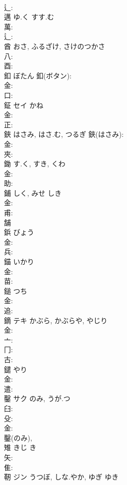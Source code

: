 \documentclass[8pt]{extreport}
\begin{document}
\begin{CJK}{UTF8}{min}
\\	辶: 
\\	邁		ゆ.く	すす.む			
\\	萬: 
\\	辶: 
\\	酋		おさ, ふるざけ, さけのつかさ				
\\	八: 
\\	酉: 
\\	釦		ぼたん			釦(ボタン): 
\\	金: 
\\	口: 
\\	鉦	セイ	かね		
\\	金: 
\\	正: 
\\	鋏		はさみ, はさ.む, つるぎ			鋏(はさみ): 
\\	金: 
\\	夾: 
\\	鋤		す.く, すき, くわ				
\\	金: 
\\	助: 
\\	鋪		しく, みせ	しき			
\\	金: 
\\	甫: 
\\	舗 
\\	鋲		びょう				
\\	金: 
\\	兵: 
\\	錨		いかり				
\\	金: 
\\	苗: 
\\	鎚		つち				
\\	金: 
\\	追: 
\\	鏑	テキ	かぶら, かぶらや, やじり		
\\	金: 
\\	亠: 
\\	冂: 
\\	古: 
\\	鑓		やり				
\\	金: 
\\	遣: 
\\	鑿	サク	のみ, うが.つ		
\\	臼: 
\\	殳: 
\\	金: 
\\	鑿(のみ), 
\\	雉		きじ	き			
\\	矢: 
\\	隹: 
\\	靭	ジン	うつぼ, しな.やか, ゆぎ	ゆき	

\end{CJK}
\end{document}
